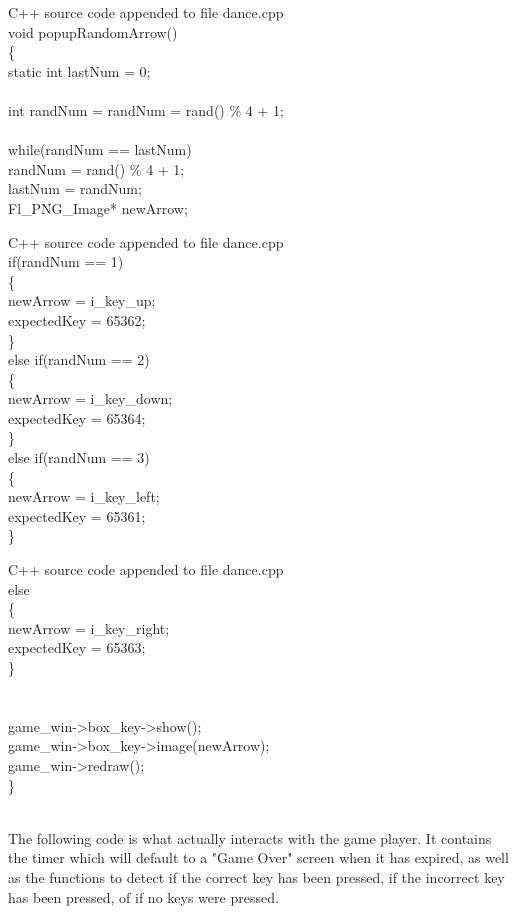 \documentclass {article}
\begin{document}
\begin{GFT}{C++ source code appended to file dance.cpp}
\+\\
\+void popupRandomArrow()\\
\+\{\\
\+	static int lastNum = 0;\\
\+\\
\+	int randNum = randNum = rand() \% 4 + 1;\\
\+\\
\+	while(randNum == lastNum)\\
\+		randNum = rand() \% 4 + 1;\\
\+	lastNum = randNum;\\
\+	Fl\_PNG\_Image* newArrow;\\
\end{GFT}
\clearpage
\begin{GFT}{C++ source code appended to file dance.cpp}
\+\\
\+	if(randNum == 1)\\
\+	\{\\
\+		newArrow = i\_key\_up;\\
\+		expectedKey = 65362; \\
\+	\}\\
\+	else if(randNum == 2)\\
\+	\{\\
\+		newArrow = i\_key\_down;\\
\+		expectedKey = 65364;\\
\+	\}\\
\+	else if(randNum == 3)\\
\+	\{\\
\+		newArrow = i\_key\_left;\\
\+		expectedKey = 65361;\\
\+	\}\\
\end{GFT}
\clearpage
\begin{GFT}{C++ source code appended to file dance.cpp}
\+\\
\+	else\\
\+	\{\\
\+		newArrow = i\_key\_right;\\
\+		expectedKey = 65363;\\
\+	\}\\
\+\\
\+\\
\+	game\_win->box\_key->show();\\
\+	game\_win->box\_key->image(newArrow);\\
\+	game\_win->redraw();\\
\+\}\\
\+\\
\end{GFT}
\clearpage
The following code is what actually interacts with the game player. It contains the timer which will default to a "Game Over" screen when it has expired, as well as the functions to detect if the correct key has been pressed, if the incorrect key has been pressed, of if no keys were pressed.
\end{document}
